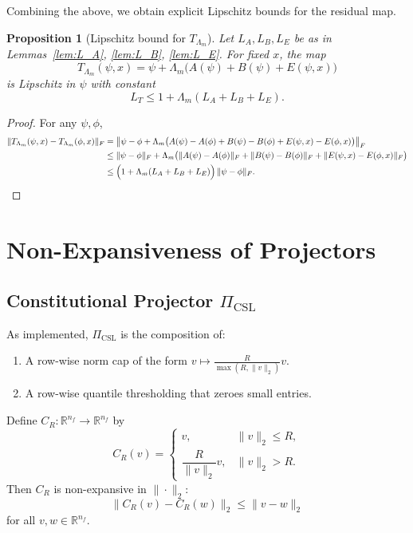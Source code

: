 \documentclass[11pt]{article}
\theoremstyle{definition}
\theoremstyle{plain}
\newtheorem{proposition}{Proposition}
\begin{document}
Combining the above, we obtain explicit Lipschitz bounds for the residual map.

\begin{proposition}[Lipschitz bound for $T_{\Lambda_m}$]\label{prop:L_T}
Let $L_A,L_B,L_E$ be as in Lemmas~\ref{lem:L_A}, \ref{lem:L_B}, \ref{lem:L_E}.
For fixed $x$, the map
\[
  T_{\Lambda_m}(\psi,x) = \psi + \Lambda_m\bigl(A(\psi) + B(\psi) + E(\psi,x)\bigr)
\]
is Lipschitz in $\psi$ with constant
\[
  L_T \le 1 + \Lambda_m(L_A + L_B + L_E).
\]
\end{proposition}

\begin{proof}
For any $\psi,\phi$,
\begin{align*}
  \|T_{\Lambda_m}(\psi,x) - T_{\Lambda_m}(\phi,x)\|_F
  &= \bigl\|\psi - \phi + \Lambda_m\bigl(A(\psi)-A(\phi) + B(\psi)-B(\phi) + E(\psi,x)-E(\phi,x)\bigr)\bigr\|_F \\
  &\le \|\psi - \phi\|_F + \Lambda_m\bigl(\|A(\psi)-A(\phi)\|_F + \|B(\psi)-B(\phi)\|_F + \|E(\psi,x)-E(\phi,x)\|_F\bigr) \\
  &\le \Bigl(1 + \Lambda_m(L_A + L_B + L_E)\Bigr)\,\|\psi - \phi\|_F.
\end{align*}
\end{proof}

\section{Non-Expansiveness of Projectors}

\subsection{Constitutional Projector $\Pi_{\mathrm{CSL}}$}

As implemented, $\Pi_{\mathrm{CSL}}$ is the composition of:
\begin{enumerate}
  \item A row-wise norm cap of the form $v \mapsto \frac{R}{\max(R,\|v\|_2)}v$.
  \item A row-wise quantile thresholding that zeroes small entries.
\end{enumerate}

\begin{lemma}\label{lem:normcap}
Define $C_R : \mathbb{R}^{n_f} \to \mathbb{R}^{n_f}$ by
\[
  C_R(v) =
  \begin{cases}
    v, & \|v\|_2 \le R, \\
    \dfrac{R}{\|v\|_2} v, & \|v\|_2 > R.
  \end{cases}
\]
Then $C_R$ is non-expansive in $\|\cdot\|_2$:
\[
  \|C_R(v) - C_R(w)\|_2 \le \|v - w\|_2
\]
for all $v,w \in \mathbb{R}^{n_f}$.
\end{lemma}
\end{document}
